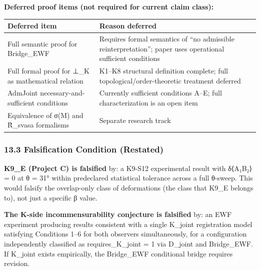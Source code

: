 \documentclass[
  11pt,
]{article}
\newcounter{none} %
\begin{document}
\textbf{Deferred proof items (not required for current claim class):}

{\def\LTcaptype{none} %
\begin{longtable}[]{@{}
  >{\raggedright\arraybackslash}p{}
  >{\raggedright\arraybackslash}p{}@{}}
\toprule\noalign{}
\begin{minipage}[b]{\linewidth}\raggedright
Deferred item
\end{minipage} & \begin{minipage}[b]{\linewidth}\raggedright
Reason deferred
\end{minipage} \\
\midrule\noalign{}
\endhead
\bottomrule\noalign{}
\endlastfoot
Full semantic proof for Bridge\_EWF & Requires formal semantics of ``no
admissible reinterpretation''; paper uses operational sufficient
conditions \\
Full formal proof for ⊥\_K as mathematical relation & K1--K8 structural
definition complete; full topological/order-theoretic treatment
deferred \\
AdmJoint necessary-and-sufficient conditions & Currently sufficient
conditions A--E; full characterization is an open item \\
Equivalence of σ(M) and R̂\_svasa formalisms & Separate research track \\
\end{longtable}
}

\subsubsection{13.3 Falsification Condition
(Restated)}\label{falsification-condition-restated}

\textbf{K9\_E (Project C) is falsified} by: a K9-S12 experimental result
with δ⟨A₁B₂⟩ = 0 at θ = 31° within predeclared statistical tolerance
across a full θ-sweep. This would falsify the overlap-only class of
deformations (the class that K9\_E belongs to), not just a specific β
value.

\textbf{The K-side incommensurability conjecture is falsified} by: an
EWF experiment producing results consistent with a single K\_joint
registration model satisfying Conditions 1--6 for both observers
simultaneously, for a configuration independently classified as
requires\_K\_joint = 1 via D\_joint and Bridge\_EWF. If K\_joint exists
empirically, the Bridge\_EWF conditional bridge requires revision.
\end{document}
